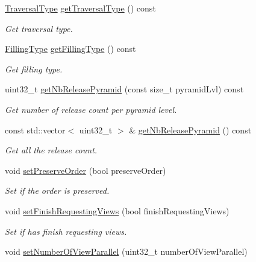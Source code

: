 \begin{DoxyCompactItemize}
\hyperlink{namespacefi_a7ba5ce68668e7f273b22e5f56ca6dfcb}{Traversal\+Type} \hyperlink{classfi_1_1FastImage_1_1Options_a8f422b375446460e2200597fd064e79c}{get\+Traversal\+Type} () const
\begin{DoxyCompactList}\small\item\em Get traversal type. \end{DoxyCompactList}\item 
\hyperlink{namespacefi_a6808b618c85d179a330ca388162215bd}{Filling\+Type} \hyperlink{classfi_1_1FastImage_1_1Options_a876e33a2cd11a1991b0be6a5938e5cc0}{get\+Filling\+Type} () const
\begin{DoxyCompactList}\small\item\em Get filling type. \end{DoxyCompactList}\item 
uint32\+\_\+t \hyperlink{classfi_1_1FastImage_1_1Options_ad8ec980d0584b09f7a65e7e502ab8b5e}{get\+Nb\+Release\+Pyramid} (const size\+\_\+t pyramid\+Lvl) const
\begin{DoxyCompactList}\small\item\em Get number of release count per pyramid level. \end{DoxyCompactList}\item 
const std\+::vector$<$ uint32\+\_\+t $>$ \& \hyperlink{classfi_1_1FastImage_1_1Options_a87a3e8fc4fcee3a19d4c8ee9885af55c}{get\+Nb\+Release\+Pyramid} () const
\begin{DoxyCompactList}\small\item\em Get all the release count. \end{DoxyCompactList}\item 
void \hyperlink{classfi_1_1FastImage_1_1Options_a6634270a8e5c86abaa8ed546804df533}{set\+Preserve\+Order} (bool preserve\+Order)
\begin{DoxyCompactList}\small\item\em Set if the order is preserved. \end{DoxyCompactList}\item 
void \hyperlink{classfi_1_1FastImage_1_1Options_a7c0ae60a439a4be02b4600618e2fcebe}{set\+Finish\+Requesting\+Views} (bool finish\+Requesting\+Views)
\begin{DoxyCompactList}\small\item\em Set if has finish requesting views. \end{DoxyCompactList}\item 
void \hyperlink{classfi_1_1FastImage_1_1Options_aaf52184c01378906412eda1cf8da605b}{set\+Number\+Of\+View\+Parallel} (uint32\+\_\+t number\+Of\+View\+Parallel)

\end{DoxyCompactItemize}
